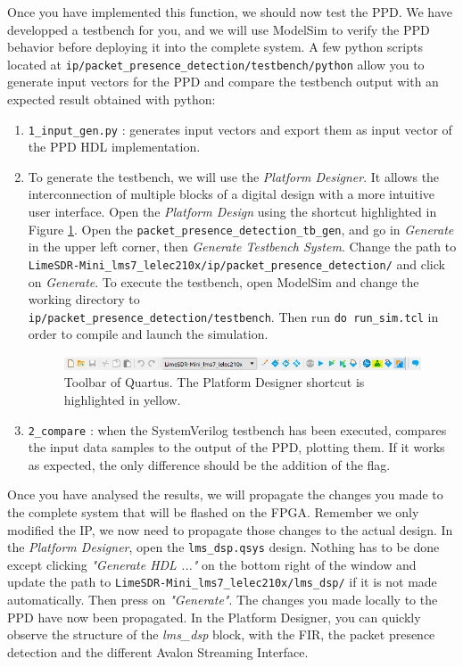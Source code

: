 Once you have implemented this function, we should now test the PPD. We have developped a testbench for you, and we will use ModelSim to verify the PPD behavior before deploying it into the complete system. A few python scripts located at \texttt{ip/packet\_presence\_detection/testbench/python} allow you to generate input vectors for the PPD and compare the testbench output with an expected result obtained with python:

\begin{enumerate}
    \item \texttt{1\_input\_gen.py} : generates input vectors and export them as input vector of the PPD HDL implementation.
    
    \item To generate the testbench, we will use the \textit{Platform Designer}. It allows the interconnection of multiple blocks of a digital design with a more intuitive user interface. Open the \textit{Platform Design} using the shortcut highlighted in Figure \ref{fig:quartus_platform_designer}. Open the \texttt{packet\_presence\_detection\_tb\_gen}, and go in \textit{Generate} in the upper left corner, then \textit{Generate Testbench System}. Change the path to \texttt{LimeSDR-Mini\_lms7\_lelec210x/ip/packet\_presence\_detection/} and click on \textit{Generate}. To execute the testbench, open ModelSim and change the working directory to\\ \texttt{ip/packet\_presence\_detection/testbench}. Then run \texttt{do run\_sim.tcl} in order to compile and launch the simulation.

\begin{figure}[H]
    \centering
    \includegraphics[scale=0.7]{figures/quartus_toolbar.PNG}
    \caption{Toolbar of Quartus. The Platform Designer shortcut is highlighted in yellow.}
    \label{fig:quartus_platform_designer}
\end{figure}

    \item \texttt{2\_compare} : when the SystemVerilog testbench has been executed, compares the input data samples to the output of the PPD, plotting them. If it works as expected, the only difference should be the addition of the flag.
\end{enumerate}

Once you have analysed the results, we will propagate the changes you made to the complete system that will be flashed on the FPGA. Remember we only modified the IP, we now need to propagate those changes to the actual design. In the \textit{Platform Designer}, open the \texttt{lms\_dsp.qsys} design. Nothing has to be done except clicking \textit{"Generate HDL ..."} on the bottom right of the window and update the path to
\texttt{LimeSDR-Mini\_lms7\_lelec210x/lms\_dsp/} if it is not made automatically. Then press on \textit{"Generate"}. The changes you made locally to the PPD have now been propagated. In the Platform Designer, you can quickly observe the structure of the \textit{lms\_dsp} block, with the FIR, the packet presence detection and the different Avalon Streaming Interface.

